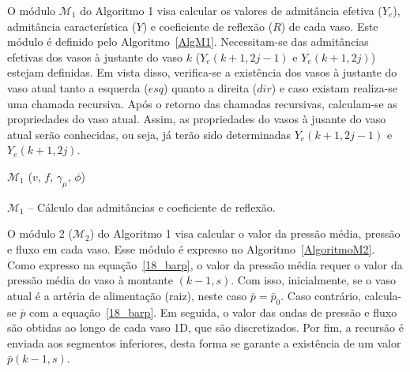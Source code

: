 \documentclass[
        english,			
        brazil			        %
        ,<...>]{abntbibufjf}
\begin{document}
O módulo $\mathcal{M}_1$ do Algoritmo 1  visa calcular os valores de admitância efetiva ($Y_e$), admitância característica ($Y$) e coeficiente de reflexão ($R$) de cada vaso. Este módulo é definido pelo Algoritmo~\ref{AlgM1}. Necessitam-se das admitâncias efetivas dos vasos à justante do vaso $k$ ($Y_e(k+1,2j-1)$ e $Y_e(k+1,2j)$) estejam definidas. Em vista disso, verifica-se a existência dos vasos à justante do vaso atual tanto a esquerda ($esq$) quanto a direita ($dir$) e caso existam realiza-se uma chamada recursiva. Após o retorno das chamadas recursivas, calculam-se as propriedades do vaso atual. Assim, as propriedades do vasos à jusante do vaso atual serão conhecidas, ou seja, já terão sido determinadas $Y_e(k+1,2j-1)$ e $Y_e(k+1,2j)$.
\newpage

\begin{algorithm}[H]
$\mathcal{M}_1$ ($v$, $f$, $\gamma_{\mu}$, $\phi$) \\
	\caption{$\mathcal{M}_1$ -- Cálculo das admitâncias e coeficiente de reflexão.}
	\label{AlgM1}
\end{algorithm}

O módulo 2 ($\mathcal{M}_2$) do Algoritmo 1 visa calcular o valor da pressão média, pressão e fluxo em cada vaso. Esse módulo é expresso no Algoritmo~\ref{AlgoritmoM2}. Como expresso na equação~\eqref{18_barp}, o valor da pressão média requer o valor da pressão média do vaso à montante $(k-1,s)$. Com isso, inicialmente, se o vaso atual é a artéria de alimentação (raiz), neste caso $\bar{p} = \bar{p}_0$. Caso contrário, calcula-se $\bar{p}$ com a equação~\eqref{18_barp}. Em seguida, o valor das ondas de pressão e fluxo são obtidas ao longo de cada vaso 1D, que são discretizados. Por fim, a recursão é enviada aos segmentos inferiores, desta forma se garante a existência de um valor $\bar{p}(k-1,s)$.
\end{document}
